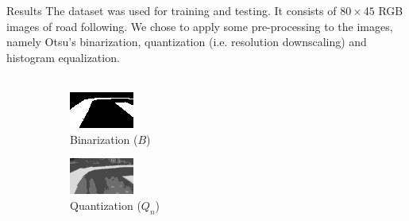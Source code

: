\documentclass[final,hyperref={pdfpagelabels=false},notheorems]{beamer}
\theoremstyle{thesisstyle}
\begin{document}
\begin{frame}[t]
\begin{columns}[t]
\begin{column}{.5225\textwidth}
    \begin{block}{Results}
      The \cite{self-driving} dataset was used for training and testing. It consists of $80\times
      45$ RGB images of road following. We chose to apply some pre-processing to the images, namely
      Otsu's binarization, quantization (i.e. resolution downscaling) and histogram
      equalization.\\~\\
      \begin{figure}
        \begin{subfigure}{0.3\linewidth}
          \centering\includegraphics[width=\textwidth]{imgs/binary_up.png}
          \captionsetup{justification=centering}
          \caption*{Binarization ($B$)}
        \end{subfigure}
        \begin{subfigure}{0.3\linewidth}
          \centering\includegraphics[width=\textwidth]{imgs/trans_up.png}
          \captionsetup{justification=centering}
          \caption*{Quantization ($Q_n$)}
        \end{subfigure}
        \begin{subfigure}{0.3\linewidth}

\end{subfigure}
\end{figure}
\end{block}
\end{column}
\end{columns}
\end{frame}
\end{document}
